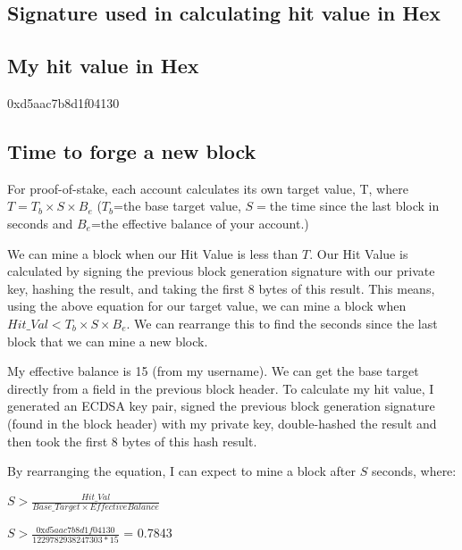 \documentclass[11pt]{article}
\begin{document}
	\subsection*{Signature used in calculating hit value in Hex}
	
	\subsection*{My hit value in Hex}
	0xd5aac7b8d1f04130
	
	\subsection*{Time to forge a new block}
	For proof-of-stake, each account calculates its own target value, T, where $T = T_b \times S \times B_e$ ($T_b$=the base target value, $S=$the time since the last block in seconds and $B_e$=the effective balance of your account.) \newline
	
	We can mine a block when our Hit Value is less than $T$. Our Hit Value is calculated by signing the previous block generation signature with our private key, hashing the result, and taking the first 8 bytes of this result. This means, using the above equation for our target value, we can mine a block when $Hit\_Val < T_b \times S \times B_e$. We can rearrange this to find the seconds since the last block that we can mine a new block. \newline
	
	My effective balance is 15 (from my username). We can get the base target directly from a field in the previous block header. To calculate my hit value, I generated an ECDSA key pair, signed the previous block generation signature (found in the block header) with my private key, double-hashed the result and then took the first 8 bytes of this hash result. \newline
	
	By rearranging the equation, I can expect to mine a block after $S$ seconds, where: \newline
	
	$S > \frac{Hit\_Val}{Base\_Target \times EffectiveBalance}$ \newline
	
	$S > \frac{\text{0x}d5aac7b8d1f04130}{1229782938247303*15}$ = 0.7843 \newline
	
\end{document}
